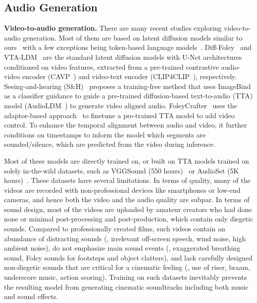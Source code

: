 \subsection{Audio Generation}\label{sec:related_audio}

\textbf{Video-to-audio generation.}
There are many recent studies exploring video-to-audio generation. Most of them are based on latent diffusion models similar to ours~\citep{luo2024diff, xu2024video, xing2024seeing, zhang2024foleycrafter} with a few exceptions being token-based language models~\citep{kondratyuk2023videopoet, mei2023foleygen}. Diff-Foley~\citep{luo2024diff} and VTA-LDM~\citep{xu2024video} are the standard latent diffusion models with U-Net architectures conditioned on video features, extracted from a pre-trained contrastive audio-video encoder (CAVP~\citep{luo2024diff}) and video-text encoder (CLIP4CLIP~\citep{luo2022clip4clip}), respectively. Seeing-and-hearing (S\&H)~\citep{xing2024seeing} proposes a training-free method that uses ImageBind as a classifier guidance to guide a pre-trained diffusion-based text-to-audio (TTA) model (AudioLDM~\citep{liu2023audioldm}) to generate video aligned audio. FoleyCrafter~\citep{zhang2024foleycrafter} uses the adaptor-based approach~\citep{zhang2023adding} to finetune a pre-trained TTA model to add video control. To enhance the temporal alignment between audio and video, it further conditions on timestamps to inform the model which segments are sounded/silence, which are predicted from the video during inference.

Most of these models are directly trained on, or built on TTA models trained on solely in-the-wild datasets, such as VGGSound (550 hours)~\citep{vggsound} or AudioSet (5K hours)~\citep{gemmeke2017audio}.
These datasets have several limitations. In terms of quality, many of the videos are recorded with non-professional devices like smartphones or low-end cameras, and hence both the video and the audio quality are subpar.
In terms of sound design, most of the videos are uploaded by amateur creators who had done none or minimal post-processing and post-production, which contain only diegetic sounds. Compared to professionally created films, such videos contain an abundance of distracting sounds (\eg, irrelevant off-screen speech, wind noise, high ambient noise), do not emphasize main sound events (\eg, exaggerated breathing sound, Foley sounds for footsteps and object clatters), and lack carefully designed non-diegetic sounds that are critical for a cinematic feeling (\eg, use of riser, braam, underscore music, action scoring).
Training on such datasets inevitably prevents the resulting model from generating cinematic soundtracks including both music and sound effects.

